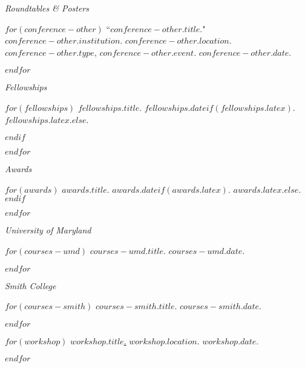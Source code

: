 \documentclass[11pt,article,oneside]{memoir}
\begin{document}
\pagebreak[1]
\ind \emph{Roundtables \& Posters}

\smallskip

$for(conference-other)$
\ind ``$conference-other.title$." $conference-other.institution$. $conference-other.location$. $conference-other.type$, \emph{$conference-other.event$}. $conference-other.date$. \normalsize

\smallskip
$endfor$

\bigskip
\pagebreak[1]


\ind \emph{Fellowships}

\smallskip

$for(fellowships)$
\ind $fellowships.title$. $fellowships.date$$if(fellowships.latex)$. $fellowships.latex$.$else${.}

\smallskip
$endif$

$endfor$

\bigskip

\ind \emph{Awards}

\smallskip

$for(awards)$
\ind $awards.title$. $awards.date$$if(awards.latex)$. $awards.latex$.$else${.}$endif$

\smallskip
$endfor$

\bigskip
\pagebreak[1]


\ind \emph{University of Maryland}

\smallskip

$for(courses-umd)$
\ind $courses-umd.title$. $courses-umd.date$.

\smallskip
$endfor$

\bigskip

\ind \emph{Smith College}

\smallskip

$for(courses-smith)$
\ind $courses-smith.title$. $courses-smith.date$.

\smallskip
$endfor$

\bigskip
\pagebreak[1]


$for(workshop)$
\ind \href{$workshop.url$}{$workshop.title$.} $workshop.location$. $workshop.date$.

\smallskip
$endfor$
\end{document}
